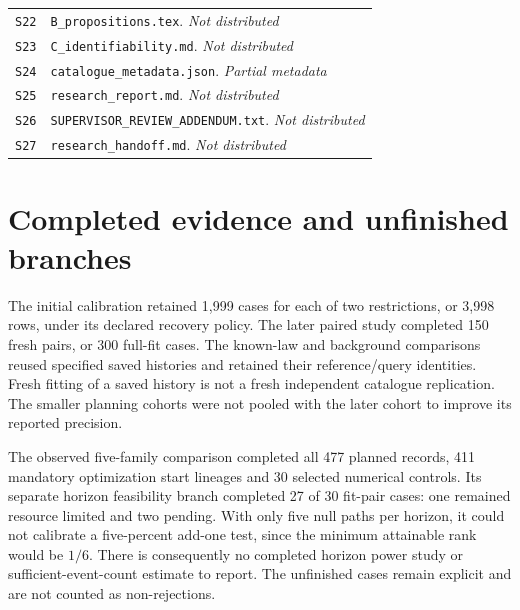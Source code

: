 \begin{longtable}{@{}>{\raggedright\arraybackslash}p{}>{\raggedright\arraybackslash}p{}@{}}
\hypertarget{S22}{}\label{source:S22}\texttt{S22} & \nolinkurl{B_propositions.tex}. \textit{Not distributed} \\
\hypertarget{S23}{}\label{source:S23}\texttt{S23} & \nolinkurl{C_identifiability.md}. \textit{Not distributed} \\
\hypertarget{S24}{}\label{source:S24}\texttt{S24} & \nolinkurl{catalogue_metadata.json}. \textit{Partial metadata} \\
\hypertarget{S25}{}\label{source:S25}\texttt{S25} & \nolinkurl{research_report.md}. \textit{Not distributed} \\
\hypertarget{S26}{}\label{source:S26}\texttt{S26} & \nolinkurl{SUPERVISOR_REVIEW_ADDENDUM.txt}. \textit{Not distributed} \\
\hypertarget{S27}{}\label{source:S27}\texttt{S27} & \nolinkurl{research_handoff.md}. \textit{Not distributed} \\
\bottomrule
\end{longtable}

\section{Completed evidence and unfinished branches}

The initial calibration retained 1,999 cases for each of two restrictions, or 3,998 rows, under its declared recovery policy. The later paired study completed 150 fresh pairs, or 300 full-fit cases. The known-law and background comparisons reused specified saved histories and retained their reference/query identities. Fresh fitting of a saved history is not a fresh independent catalogue replication. The smaller planning cohorts were not pooled with the later cohort to improve its reported precision.

The observed five-family comparison completed all 477 planned records, 411 mandatory optimization start lineages and 30 selected numerical controls. Its separate horizon feasibility branch completed 27 of 30 fit-pair cases: one remained resource limited and two pending. With only five null paths per horizon, it could not calibrate a five-percent add-one test, since the minimum attainable rank would be $1/6$. There is consequently no completed horizon power study or sufficient-event-count estimate to report. The unfinished cases remain explicit and are not counted as non-rejections.

